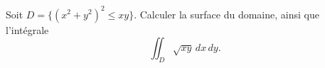 \begin{exercice}\label{exoIntegralesMultiples0009}


Soit $D=\{(x^2+y^2)^2\leq xy\}$. Calculer la surface du domaine, ainsi que l'intégrale
\begin{equation}
\iint_D \sqrt{xy} \, dx\, dy.
\end{equation}

\end{exercice}
